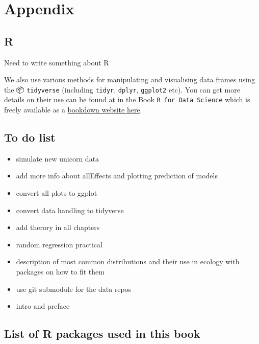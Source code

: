 \documentclass[
  12pt,
]{book}
\providecommand{\tightlist}{%
  \setlength{\itemsep}{0pt}\setlength{\parskip}{0pt}}
\begin{document}
\hypertarget{part-appendix}{%
\part{Appendix}\label{part-appendix}}

\hypertarget{r-1}{%
\chapter*{R}\label{r-1}}

Need to write something about R

We also use various methods for manipulating and visualising data frames using the 📦 \texttt{tidyverse} \citep{R-tidyverse} (including \texttt{tidyr}, \texttt{dplyr}, \texttt{ggplot2} etc).
You can get more details on their use can be found at in the Book \texttt{R\ for\ Data\ Science} \citep{wickhamDataScienceImport2016} which is freely available as a \href{http://r4ds.had.co.nz/}{bookdown website here}.

\hypertarget{to-do-list}{%
\chapter*{To do list}\label{to-do-list}}

\begin{itemize}
\tightlist
\item
  simulate new unicorn data
\item
  add more info about allEffects and plotting prediction of models
\item
  convert all plots to ggplot
\item
  convert data handling to tidyverse
\item
  add therory in all chapters
\item
  random regression practical
\item
  description of most common distributions and their use in ecology with packages on how to fit them
\item
  use git submodule for the data repos
\item
  intro and preface
\end{itemize}

\hypertarget{list-of-r-packages-used-in-this-book}{%
\chapter*{List of R packages used in this book}\label{list-of-r-packages-used-in-this-book}}
\end{document}
